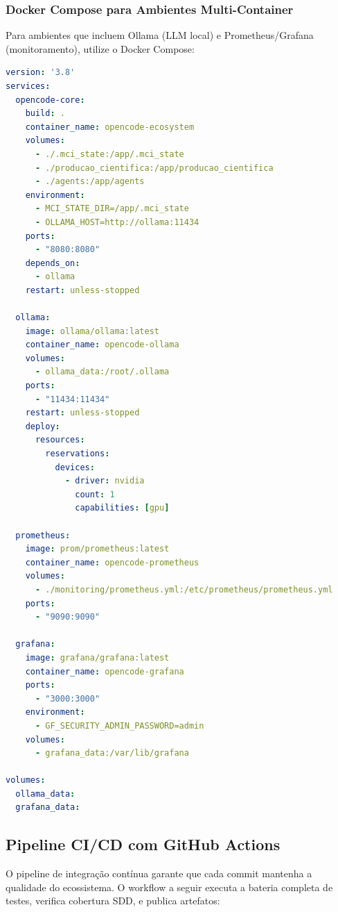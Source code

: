 \subsubsection{Docker Compose para Ambientes Multi-Container}

Para ambientes que incluem Ollama (LLM local) e Prometheus/Grafana (monitoramento), utilize o Docker Compose:

\begin{lstlisting}[language=yaml,caption={docker-compose.yml para stack completa},label={lst:docker-compose}]
version: '3.8'
services:
  opencode-core:
    build: .
    container_name: opencode-ecosystem
    volumes:
      - ./.mci_state:/app/.mci_state
      - ./producao_cientifica:/app/producao_cientifica
      - ./agents:/app/agents
    environment:
      - MCI_STATE_DIR=/app/.mci_state
      - OLLAMA_HOST=http://ollama:11434
    ports:
      - "8080:8080"
    depends_on:
      - ollama
    restart: unless-stopped

  ollama:
    image: ollama/ollama:latest
    container_name: opencode-ollama
    volumes:
      - ollama_data:/root/.ollama
    ports:
      - "11434:11434"
    restart: unless-stopped
    deploy:
      resources:
        reservations:
          devices:
            - driver: nvidia
              count: 1
              capabilities: [gpu]

  prometheus:
    image: prom/prometheus:latest
    container_name: opencode-prometheus
    volumes:
      - ./monitoring/prometheus.yml:/etc/prometheus/prometheus.yml
    ports:
      - "9090:9090"

  grafana:
    image: grafana/grafana:latest
    container_name: opencode-grafana
    ports:
      - "3000:3000"
    environment:
      - GF_SECURITY_ADMIN_PASSWORD=admin
    volumes:
      - grafana_data:/var/lib/grafana

volumes:
  ollama_data:
  grafana_data:
\end{lstlisting}

\subsection{Pipeline CI/CD com GitHub Actions}
\label{sec:cicd}

O pipeline de integração contínua garante que cada commit mantenha a qualidade do ecossistema. O workflow a seguir executa a bateria completa de testes, verifica cobertura SDD, e publica artefatos:

